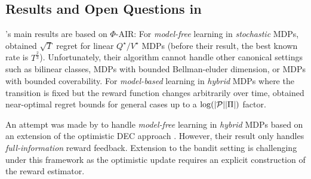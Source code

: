 \subsection{Results and Open Questions in \cite{liu2025decision}} \label{sec: open question}
\cite{liu2025decision}'s main results are based on $\Phi$-AIR: For \emph{model-free} learning in \emph{stochastic} MDPs, \cite{liu2025decision} obtained $\sqrt{T}$ regret for linear $Q^\star/V^\star$ MDPs (before their result, the best known rate is $T^{\frac{2}{3}}$). Unfortunately, their algorithm cannot handle other canonical settings such as bilinear classes, MDPs with bounded Bellman-eluder dimension, or MDPs with bounded coverability. For \emph{model-based} learning in \emph{hybrid} MDPs where the transition is fixed but the reward function changes arbitrarily over time, \cite{liu2025decision} obtained near-optimal regret bounds for general cases up to a $\log(|\mathcal{P}||\Pi|)$ factor.  

An attempt was made by \cite{liu2025decision} to handle \emph{model-free} learning in \emph{hybrid} MDPs based on an extension of the optimistic DEC approach \citep{foster2024model}.  However, their result only handles \emph{full-information} reward feedback. Extension to the bandit setting is challenging under this framework as the optimistic update requires an explicit construction of the reward estimator. 

